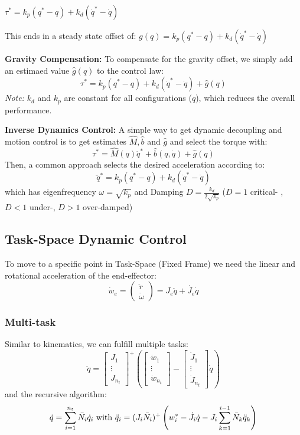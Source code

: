 \documentclass[fontsize=6pt,DIV=calc,a4paper,ngerman]{scrartcl}
\begin{document}
\begin{multicols*}{4}
	\centerline{$\tau^* = k_p(q^*-q)+k_d(\dot{q}^*-\dot{q})$}
	This ends in a steady state offset of:  $g(q) = k_p(q^*-q)+k_d(\dot{q}^*-\dot{q})$

	\textbf{Gravity Compensation:}
	To compensate for the gravity offset, we simply add an estimaed value $\hat{g}(q)$ to the control law:
	$$\tau^* = k_p(q^*-q)+k_d(\dot{q}^*-\dot{q})+\hat{g}(q)$$
	\textit{Note:} $k_d$ and $k_p$ are constant for all configurations ($q$), which reduces the overall performance.

	\textbf{Inverse Dynamics Control:}
	A simple way to get dynamic decoupling and motion control is to get estimates $\hat{M}, \hat{b}$ and $\hat{g}$ and select the torque with:
	$$\tau^* = \hat{M}(q)\ddot{q}^*+\hat{b}(q,\dot{q})+\hat{g}(q)$$
	Then, a common approach selects the desired acceleration according to:
	$$\ddot{q}^* = k_p(q^*-q)+k_d(\dot{q}^*-\dot{q})$$
	which has eigenfrequency $\omega = \sqrt{k_p}$ and Damping
	$D= \frac{k_d}{2\sqrt{k_p}}$ ($D=1$ critical- , $D<1$ under-, $D>1$ over-damped)

	\subsection{Task-Space Dynamic Control}
	To move to a specific point in Task-Space (Fixed Frame) we need the linear and rotational acceleration of the end-effector:
	$$\dot{w}_e= \begin{pmatrix}\ddot{r}  \\\dot{\omega}\end{pmatrix} = J_e\ddot{q} +\dot{J_e}\dot{q}$$
	\subsubsection{Multi-task}
	Similar to kinematics, we can fulfill multiple tasks:
	$$\ddot{q}=\begin{bmatrix}J_1 \\ \vdots \\ J_{n_t}\end{bmatrix}^+ \left( \begin{bmatrix}\dot{w}_1 \\ \vdots\\ \dot{w}_{n_t}\end{bmatrix}-\begin{bmatrix}\dot{J}_1 \\ \vdots \\ \dot{J}_{n_t}\end{bmatrix}\dot{q}\right)$$
	and the recursive algorithm:
	$$\dot{q}= \sum_{i=1}^{n_t}\Bar{N}_i\dot{q}_i \text{ with } \ddot{q}_i = (J_i\Bar{N}_i)^+\left( w_i^* -\dot{J_i}\dot{q}- J_i \sum_{k=1}^{i-1}\Bar{N}_k\ddot{q}_k\right)$$


\end{multicols*}
\end{document}
